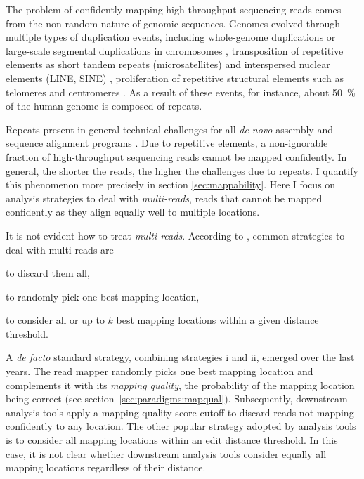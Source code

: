The problem of confidently mapping high-throughput sequencing reads comes from the non-random nature of genomic sequences.
Genomes evolved through multiple types of duplication events, including whole-genome duplications \citep{Wolfe1997,Dehal2005} or large-scale segmental duplications in chromosomes \citep{Bailey2001,Samonte2002}, transposition of repetitive elements as short tandem repeats (microsatellites) \citep{Wang1994a,Wooster1994} and interspersed nuclear elements (LINE, SINE) \citep{Smit1996}, proliferation of repetitive structural elements such as telomeres and centromeres \citep{Meyne1990}.
As a result of these events, for instance, about 50~\% of the human genome is composed of repeats.

Repeats present in general technical challenges for all \emph{de novo} assembly and sequence alignment programs \citep{Treangen2011}.
Due to repetitive elements, a non-ignorable fraction of high-throughput sequencing reads cannot be mapped confidently.
In general, the shorter the reads, the higher the challenges due to repeats.
I quantify this phenomenon more precisely in section \ref{sec:mappability}.
Here I focus on analysis strategies to deal with \emph{multi-reads}, \ie reads that cannot be mapped confidently as they align equally well to multiple locations.

It is not evident how to treat \emph{multi-reads}.
According to \citeauthor{Treangen2011}, common strategies to deal with multi-reads are
\begin{inparaenum}[(i)]
\item to discard them all,
\item to randomly pick one best mapping location,
\item to consider all or up to $k$ best mapping locations within a given distance threshold.
\end{inparaenum}
A \emph{de facto} standard strategy, combining strategies i and ii, emerged over the last years.
The read mapper randomly picks one best mapping location and complements it with its \emph{mapping quality}, \ie the probability of the mapping location being correct (see section~\ref{sec:paradigms:mapqual}).
Subsequently, downstream analysis tools apply a mapping quality score cutoff to discard reads not mapping confidently to any location.
The other popular strategy adopted by analysis tools is to consider all mapping locations within an edit distance threshold.
In this case, it is not clear whether downstream analysis tools consider equally all mapping locations regardless of their distance.

